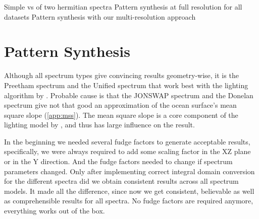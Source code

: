 Simple \InvFourierTransform vs \InvFourierTransform of two hermitian spectra
Pattern synthesis at full resolution for all datasets
Pattern synthesis with our multi-resolution approach

\section{Pattern Synthesis}
\label{sec:results:synthesis}
Although all spectrum types give convincing results geometry-wise, it is the
Preetham spectrum and the Unified spectrum that work best with the lighting
algorithm by \cite{article:oceanlighting}. Probable cause is that the JONSWAP
spectrum and the Donelan spectrum give not that good an approximation of the
ocean surface's mean square slope (\ref{app:mss}). The mean square slope is a
core component of the lighting model by \cite{article:oceanlighting}, and thus
has large influence on the result.

In the beginning we needed several fudge factors to generate acceptable results,
specifically, we were always required to add some scaling factor in the XZ plane
or in the Y direction. And the fudge factors needed to change if spectrum
parameters changed.
Only after implementing correct integral domain conversion for the different
spectra did we obtain consistent results across all spectrum models. It made all
the difference, since now we get consistent, believable as well as
comprehensible results for all spectra. No fudge factors are required anymore,
everything works out of the box.

